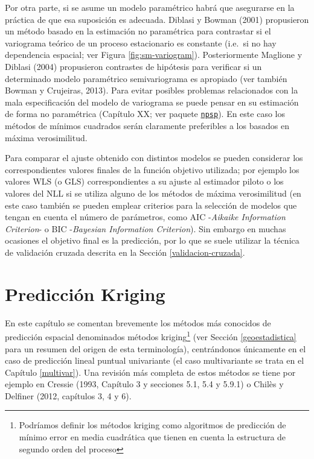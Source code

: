 \documentclass[
  spanish,
]{book}
\theoremstyle{break}
\theoremstyle{definition}
\theoremstyle{definition}
\theoremstyle{definition}
\theoremstyle{definition}
\theoremstyle{remark}
\begin{document}
Por otra parte, si se asume un modelo paramétrico habrá que asegurarse en la práctica de que esa suposición es adecuada.
Diblasi y Bowman (2001) propusieron un método basado en la estimación no paramétrica para contrastar si el variograma teórico de un proceso estacionario es constante (i.e.~si no hay dependencia espacial; ver Figura \ref{fig:sm-variogram}).
Posteriormente Maglione y Diblasi (2004) propusieron contrastes de hipótesis para verificar si un determinado modelo paramétrico semivariograma es apropiado (ver también Bowman y Crujeiras, 2013).
Para evitar posibles problemas relacionados con la mala especificación del modelo de variograma se puede pensar en su estimación de forma no paramétrica
(Capítulo XX; ver paquete \href{https://rubenfcasal.github.io/post/geoestadistica-no-parametrica-con-el-paquete-npsp}{\texttt{npsp}}).
En este caso los métodos de mínimos cuadrados serán claramente preferibles a los basados en máxima verosimilitud.

Para comparar el ajuste obtenido con distintos modelos se pueden considerar los correspondientes valores finales de la función objetivo utilizada; por ejemplo los valores WLS (o GLS) correspondientes a su ajuste al estimador piloto o los valores del NLL si se utiliza alguno de los métodos de máxima verosimilitud (en este caso también se pueden emplear criterios para la selección de modelos que tengan en cuenta el número de parámetros, como AIC -\emph{Aikaike Information Criterion}- o BIC -\emph{Bayesian Information Criterion}).
Sin embargo en muchas ocasiones el objetivo final es la predicción, por lo que se suele utilizar la técnica de validación cruzada descrita en la Sección \ref{validacion-cruzada}.

\hypertarget{kriging}{%
\chapter{Predicción Kriging}\label{kriging}}

En este capítulo se comentan brevemente los métodos más conocidos de predicción espacial denominados métodos kriging\footnote{Podríamos definir los métodos kriging como algoritmos de predicción de mínimo error en media cuadrática que tienen en cuenta la estructura de segundo orden del proceso} (ver Sección \ref{geoestadistica} para un resumen del origen de esta terminología), centrándonos únicamente en el caso de predicción lineal puntual univariante (el caso multivariante se trata en el Capítulo \ref{multivar}).
Una revisión más completa de estos métodos se tiene por ejemplo en Cressie (1993, Capítulo 3 y secciones 5.1, 5.4 y 5.9.1) o Chilès y Delfiner (2012, capítulos 3, 4 y 6).
\end{document}

